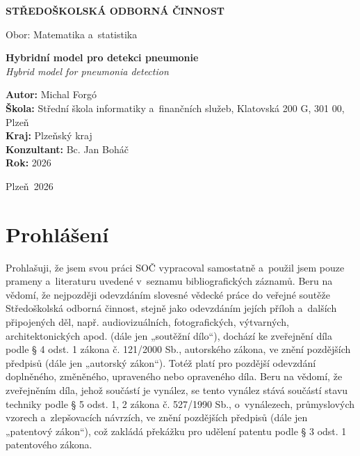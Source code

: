 \documentclass[12pt, a4paper]{report}
\newcommand{\nazevPraceCZ}{Hybridní model pro detekci pneumonie}
\newcommand{\nazevPraceEN}{Hybrid model for pneumonia detection}
\newcommand{\autor}{Michal Forgó}
\newcommand{\skola}{Střední škola informatiky a~finančních služeb, Klatovská 200 G, 301 00, Plzeň}
\newcommand{\kraj}{Plzeňský kraj}
\newcommand{\konzultant}{Bc. Jan Boháč}
\newcommand{\obor}{Matematika a~statistika}
\newcommand{\rok}{2026}
\newcommand{\misto}{Plzeň}
\begin{document}
\begin{titlepage}
    \begin{center}
        \Large \textbf{STŘEDOŠKOLSKÁ ODBORNÁ ČINNOST} \\
        \vspace{1cm}
        
        \vspace{2cm}

        \Large Obor: \obor \\
        \vspace{2cm}

        \Huge \textbf{\nazevPraceCZ} \\
        \vspace{0.5cm}
        \Large \textit{\nazevPraceEN} \\
        
        \vfill
    \end{center}

    \begin{flushleft}
        \textbf{Autor:} \autor \\
        \textbf{Škola:} \skola \\
        \textbf{Kraj:} \kraj \\
        \textbf{Konzultant:} \konzultant \\
        \textbf{Rok:} \rok
    \end{flushleft}

    \begin{center}
        \vspace{1cm}
        \misto \ \rok
    \end{center}
\end{titlepage}

\newpage
\thispagestyle{empty}
\section*{Prohlášení}

Prohlašuji, že jsem svou práci SOČ vypracoval samostatně a~použil jsem pouze prameny a~literaturu uvedené v~seznamu bibliografických záznamů.
Beru na vědomí, že nejpozději odevzdáním slovesné vědecké práce do veřejné soutěže Středoškolská odborná činnost, stejně jako odevzdáním jejích příloh a~dalších připojených děl, např.
audiovizuálních, fotografických, výtvarných, architektonických apod. (dále jen „soutěžní dílo“), dochází ke zveřejnění díla podle § 4 odst. 1 zákona č.
121/2000 Sb., autorského zákona, ve znění pozdějších předpisů (dále jen „autorský zákon“).
Totéž platí pro pozdější odevzdání doplněného, změněného, upraveného nebo opraveného díla.
Beru na vědomí, že zveřejněním díla, jehož součástí je vynález, se tento vynález stává součástí stavu techniky podle § 5 odst.
1, 2 zákona č. 527/1990 Sb., o~vynálezech, průmyslových vzorech a~zlepšovacích návrzích, ve znění pozdějších předpisů (dále jen „patentový zákon“), což zakládá překážku pro udělení patentu podle § 3 odst.
1 patentového zákona.
\end{document}
